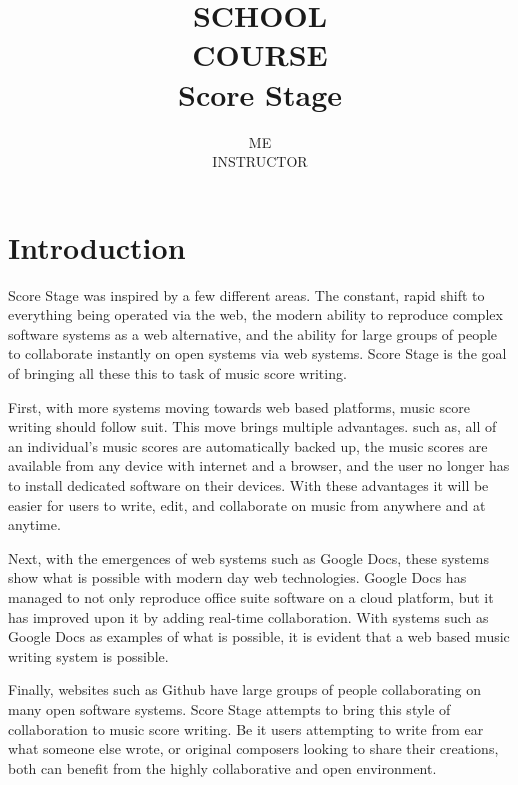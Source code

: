 \documentclass[letterpaper,12pt]{article}
\title{
    \vfill
    {\Large SCHOOL} \\
    {\Large COURSE} \\[0.75em]
    {\Huge Score Stage} \\
}
\author{
    ME \\
    INSTRUCTOR
}
\begin{document}
\begin{titlepage}
    \maketitle
    \vfill
    \thispagestyle{empty}
\end{titlepage}

\tableofcontents
\listoffigures

\thispagestyle{empty}
\newpage


\section{Introduction}

Score Stage was inspired by a few different areas. The constant, rapid shift to everything being operated via the web,
the modern ability to reproduce complex software systems as a web alternative, and the ability for large groups of
people to collaborate instantly on open systems via web systems. Score Stage is the goal of bringing all these this to
task of music score writing.

First, with more systems moving towards web based platforms, music score writing should follow suit. This move brings
multiple advantages. such as, all of an individual's music scores are automatically backed up, the music scores are
available from any device with internet and a browser, and the user no longer has to install dedicated software on their
devices. With these advantages it will be easier for users to write, edit, and collaborate on music from anywhere and at
anytime.

Next, with the emergences of web systems such as Google Docs, these systems show what is possible with modern day web
technologies. Google Docs has managed to not only reproduce office suite software on a cloud platform, but it has
improved upon it by adding real-time collaboration. With systems such as Google Docs as examples of what is possible,
it is evident that a web based music writing system is possible.

Finally, websites such as Github have large groups of people collaborating on many open software systems. Score Stage
attempts to bring this style of collaboration to music score writing. Be it users attempting to write from ear what
someone else wrote, or original composers looking to share their creations, both can benefit from the highly
collaborative and open environment.
\end{document}
